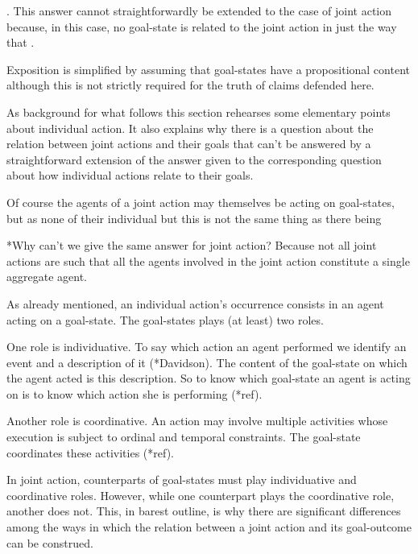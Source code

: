 \documentclass[12pt,a4paper]{extarticle}
\begin{document}
.  This answer cannot straightforwardly be extended to the case of joint action because, in this case, no goal-state is related to the joint action in just the way that . 


Exposition is simplified by assuming that goal-states have a propositional content although this is not strictly required for the truth of claims defended here. 






As background for what follows this section rehearses some elementary points about individual action.  It also explains why there is a question about the relation between joint actions and their goals that can't be answered by a straightforward extension of the answer given to the corresponding question about how individual actions relate to their goals.



Of course the agents of a joint action may themselves be acting on goal-states, but as none of their individual
 but this is not the same thing as there  being 



*Why can't we give the same answer for joint action?  Because not all joint actions are such that all the agents involved in the joint action constitute a single aggregate agent.


As already mentioned, an individual action's occurrence consists in an agent acting on a goal-state.  The goal-states plays (at least) two roles.

One role is individuative.  To say which action an agent performed we identify an event and a description of it (*Davidson).  The content of the goal-state on which the agent acted is this description.  So to know which goal-state an agent is acting on is to know which action she is performing (*ref).

Another role is coordinative.  An action may involve multiple activities whose execution is subject to ordinal and temporal constraints.  The goal-state coordinates these activities (*ref).

In joint action, counterparts of goal-states must play individuative and coordinative roles.  However, while one counterpart plays the coordinative role, another does not.  This, in barest outline, is why there are significant differences among the ways in which the relation between a joint action and its goal-outcome can be construed.
\end{document}
